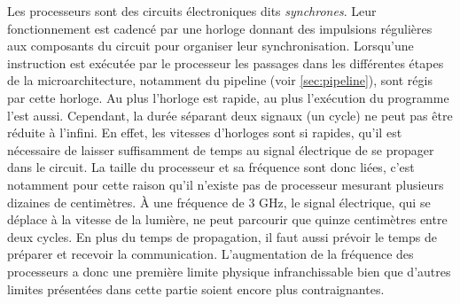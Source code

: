         Les processeurs sont des circuits électroniques dits \textit{synchrones}. Leur fonctionnement est cadencé par une horloge donnant des impulsions régulières aux composants du circuit pour organiser leur synchronisation. Lorsqu'une instruction est exécutée par le processeur les passages dans les différentes étapes de la microarchitecture, notamment du pipeline (voir \autoref{sec:pipeline}), sont régis par cette horloge. Au plus l'horloge est rapide, au plus l'exécution du programme l'est aussi. Cependant, la durée séparant deux signaux (un cycle) ne peut pas être réduite à l'infini. En effet, les vitesses d'horloges sont si rapides, qu'il est nécessaire de laisser suffisamment de temps au signal électrique de se propager dans le circuit. La taille du processeur et sa fréquence sont donc liées, c'est notamment pour cette raison qu'il n'existe pas de processeur mesurant plusieurs dizaines de centimètres. À une fréquence de 3 GHz, le signal électrique, qui se déplace à la vitesse de la lumière, ne peut parcourir que quinze centimètres entre deux cycles. En plus du temps de propagation, il faut aussi prévoir le temps de préparer et recevoir la communication. L'augmentation de la fréquence des processeurs a donc une première limite physique infranchissable bien que d'autres limites présentées dans cette partie soient encore plus contraignantes.
        
